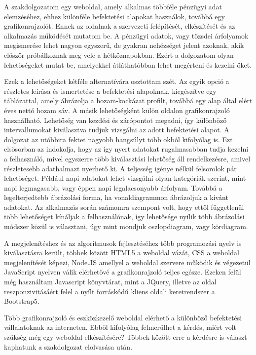 
	A szakdolgozatom egy weboldal, amely alkalmas többféle pénzügyi adat elemzéséhez, ehhez különféle befektetési alapokat használok, továbbá egy grafikonrajzolót. Ennek az oldalnak a szervezeti felépítését, elkészítését és az alkalmazás működését mutatom be.
	A pénzügyi adatok, vagy tőzsdei árfolyamok megismerése lehet nagyon egyszerű, de gyakran nehézséget jelent azoknak, akik előszőr próbálkoznak meg vele a hétköznapokban. Ezért a dolgozatom olyan lehetőségeket mutat be, amelyekkel átláthatóbban lehet megérteni és kezelni őket.

	Ezek a lehetőségeket kétféle alternatívára osztottam szét. Az egyik opció a részletes leírása és ismertetése a befektetési alapoknak, kiegészítve egy táblázattal, amely ábrázolja a hozam-kockázat profilt, továbbá egy alap által elért éves nettó hozam sáv. A másik lehetőségként külön oldalon grafikonrajzoló használható. Lehetőség van kezdési és zárópontot megadni, így különböző intervallumokat kiválasztva tudjuk vizsgálni az adott befektetési alapot. A dolgozat az utóbbira fektet nagyobb hangsúlyt több okból kifolyólag is. Ezt elsősorban az indokolja, hogy az így nyert adatokat rugalmasabban tudja kezelni a felhasználó, mivel egyszerre több kiválasztási lehetőség áll rendelkezésre, amivel részletesebb adathalmazt nyerhető ki. A teljesség igénye nélkül felsorolok pár lehetőséget. Például napi adatokat lehet vizsgálni olyan kategóriák szerint, mint napi legmagasabb, vagy éppen napi legalacsonyabb árfolyam. Továbbá a legelterjedtebb ábrázolási forma, ha vonaldiagrammon ábrázoljuk a kívánt adatokat. Az alkalmazás során számomra szempont volt, hogy ettől függetlenül több lehetőséget kínáljak a felhasználónak, így lehetősége nyílik több ábrázolási módszer közül is választani, úgy mint mondjuk oszlopdiagram, vagy kördiagram.

	A megjelenítéshez és az algoritmusok fejlesztéséhez több programozási nyelv is kiválasztásra került, többek között HTML5 a weboldal vázát, CSS a weboldal megjelenítését képezi, Node.JS amellyel a weboldal szervere működik és végezetül JavaScript nyelven válik elérhetővé a grafikonrajzoló teljes egésze. Ezeken felül még használtam Javascript könyvtárat, mint a JQuery, illetve az oldal reszponzivitásáért felel a nyílt forráskódú kliens oldali keretrendszer a Bootstrap5.

	Több grafikonrajzoló és eszközkezelő weboldal elérhető a különböző befektetési vállalatoknak az interneten.  Ebből kifolyólag felmerülhet a kérdés, miért volt szükség még egy weboldal elkészítésére? Többek között erre a kérdésre is választ kaphatunk a szakdolgozat elolvasása után.
